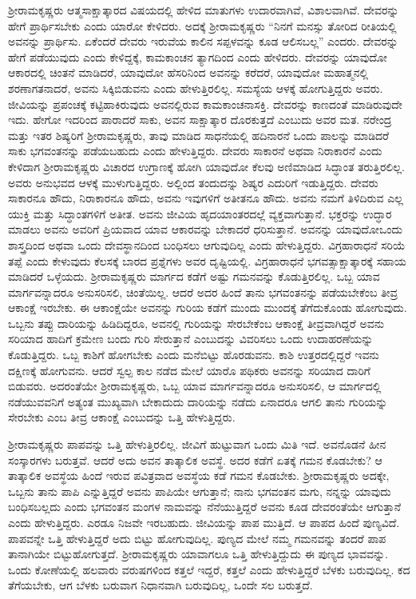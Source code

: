 \vskip 2pt

ಶ‍್ರೀರಾಮಕೃಷ್ಣರು ಆತ್ಮಸಾಕ್ಷಾತ್ಕಾರದ ವಿಷಯದಲ್ಲಿ ಹೇಳಿದ ಮಾತುಗಳು ಉದಾರವಾಗಿವೆ, ವಿಶಾಲವಾಗಿವೆ. ದೇವರನ್ನು ಹೇಗೆ ಪ್ರಾರ್ಥಿಸಬೇಕು ಎಂದು ಯಾರೋ ಕೇಳಿದರು. ಅದಕ್ಕೆ ಶ‍್ರೀರಾಮಕೃಷ್ಣರು “ನಿನಗೆ ಮನಸ್ಸು ತೋರಿದ ರೀತಿಯಲ್ಲಿ ಅವನನ್ನು ಪ್ರಾರ್ಥಿಸು. ಏಕೆಂದರೆ ದೇವರು ಇರುವೆಯ ಕಾಲಿನ ಸಪ್ಪಳವನ್ನು ಕೂಡ ಆಲಿಸಬಲ್ಲ” ಎಂದರು. ದೇವರನ್ನು ಹೇಗೆ ಪಡೆಯುವುದು ಎಂದು ಕೇಳಿದ್ದಕ್ಕೆ, ಕಾಮಕಾಂಚನ ತ್ಯಾಗದಿಂದ ಎಂದು ಹೇಳಿದರು. ದೇವರನ್ನು ಯಾವುದೋ ಆಕಾರದಲ್ಲಿ ಚಿಂತನೆ ಮಾಡಿದರೆ, ಯಾವುದೋ ಹೆಸರಿನಿಂದ ಅವನನ್ನು ಕರೆದರೆ, ಯಾವುದೋ ಮಹಾತ್ಮನಲ್ಲಿ ಶರಣಾಗತನಾದರೆ, ಅವನು ಸಿಕ್ಕಿಬಿಡುವನು ಎಂದು ಹೇಳುತ್ತಿರಲಿಲ್ಲ. ಸಮಸ್ಯೆಯ ಆಳಕ್ಕೆ ಹೋಗುತ್ತಿದ್ದರು ಅವರು. ಜೀವಿಯನ್ನು ಪ್ರಪಂಚಕ್ಕೆ ಕಟ್ಟಿಹಾಕಿರುವುದು ಅವನಲ್ಲಿರುವ ಕಾಮಕಾಂಚನಾಸಕ್ತಿ. ದೇವರನ್ನು ಕಾಣದಂತೆ ಮಾಡಿರುವುದೇ ಇದು. ಹೇಗೋ ಇದರಿಂದ ಪಾರಾದರೆ ಸಾಕು, ಅವನ ಸಾಕ್ಷಾತ್ಕಾರ ದೊರಕುತ್ತದೆ ಎಂಬುದು ಅವರ ಮತ. ನರೇಂದ್ರ ಮತ್ತು ಇತರ ಶಿಷ್ಯರಿಗೆ ಶ‍್ರೀರಾಮಕೃಷ್ಣರು, ತಾವು ಮಾಡಿದ ಸಾಧನೆಯಲ್ಲಿ ಹದಿನಾರನೆ ಒಂದು ಪಾಲನ್ನು ಮಾಡಿದರೆ ಸಾಕು ಭಗವಂತನನ್ನು ಪಡೆಯಬಹುದು ಎಂದು ಹೇಳುತ್ತಿದ್ದರು. ದೇವರು ಸಾಕಾರನೆ ಅಥವಾ ನಿರಾಕಾರನೆ ಎಂದು ಕೇಳಿದಾಗ ಶ‍್ರೀರಾಮಕೃಷ್ಣರು ವಿಚಾರದ ಉಗ್ರಾಣಕ್ಕೆ ಹೋಗಿ ಯಾವುದೋ ಕೆಲವು ಅಣಿಮಾಡಿದ ಸಿದ್ಧಾಂತ ತರುತ್ತಿರಲಿಲ್ಲ. ಅವರು ಅನುಭವದ ಆಳಕ್ಕೆ ಮುಳುಗುತ್ತಿದ್ದರು. ಅಲ್ಲಿಂದ ತಂದುದನ್ನು ಶಿಷ್ಯರ ಎದುರಿಗೆ ಇಡುತ್ತಿದ್ದರು. ದೇವರು ಸಾಕಾರನೂ ಹೌದು, ನಿರಾಕಾರನೂ ಹೌದು, ಅವನು ಇವುಗಳಿಗೆ ಅತೀತನೂ ಹೌದು. ಅವನು ನಮಗೆ ತಿಳಿದಿರುವ ಎಲ್ಲ ಯುಕ್ತಿ ಮತ್ತು ಸಿದ್ಧಾಂತಗಳಿಗೆ ಅತೀತ. ಅವನು ಜೀವಿಯ ಹೃದಯಾಂತರದಲ್ಲೆ ವ್ಯಕ್ತವಾಗುತ್ತಾನೆ. ಭಕ್ತರನ್ನು ಉದ್ಧಾರ ಮಾಡಲು ಅವನು ಅವರಿಗೆ ಪ್ರಿಯವಾದ ಯಾವ ಆಕಾರವನ್ನು ಬೇಕಾದರೆ ಧರಿಸುತ್ತಾನೆ. ಅವನನ್ನು ಯಾವುದೋ\break ಒಂದು ಶಾಸ್ತ್ರದಿಂದ ಅಥವಾ ಒಂದು ದೇವಸ್ಥಾನದಿಂದ ಬಂಧಿಸಲು ಆಗುವುದಿಲ್ಲ ಎಂದು ಹೇಳುತ್ತಿದ್ದರು. ವಿಗ್ರಹಾರಾಧನೆ ಸರಿಯೆ ತಪ್ಪೆ ಎಂದು ಕೇಳುವುದು ಕೆಲಸಕ್ಕೆ ಬಾರದ ಪ್ರಶ್ನೆಗಳು ಅವರ ದೃಷ್ಟಿಯಲ್ಲಿ. ವಿಗ್ರಹಾರಾಧನೆ ಭಗವತ್ಸಾಕ್ಷಾತ್ಕಾರಕ್ಕೆ ಸಹಾಯ ಮಾಡಿದರೆ ಒಳ್ಳೆಯದು. ಶ‍್ರೀರಾಮಕೃಷ್ಣರು ಮಾರ್ಗದ ಕಡೆಗೆ ಅಷ್ಟು ಗಮನವನ್ನು ಕೊಡುತ್ತಿರಲಿಲ್ಲ. ಒಬ್ಬ ಯಾವ ಮಾರ್ಗವನ್ನಾದರೂ ಅನುಸರಿಸಲಿ, ಚಿಂತೆಯಿಲ್ಲ. ಆದರೆ ಅದರ ಹಿಂದೆ ತಾನು ಭಗವಂತನನ್ನು ಪಡೆಯಬೇಕೆಂಬ ತೀವ್ರ ಆಕಾಂಕ್ಷೆ ಇರಬೇಕು. ಈ ಆಕಾಂಕ್ಷೆಯೇ ಅವನನ್ನು ಗುರಿಯ ಕಡೆಗೆ ಮುಂದು ಮುಂದಕ್ಕೆ ತೆಗೆದುಕೊಂಡು ಹೋಗುವುದು. ಒಬ್ಬನು ತಪ್ಪು ದಾರಿಯನ್ನು ಹಿಡಿದಿದ್ದರೂ, ಅವನಲ್ಲಿ ಗುರಿಯನ್ನು ಸೇರಬೇಕೆಂಬ ಆಕಾಂಕ್ಷೆ ತೀವ್ರವಾಗಿದ್ದರೆ ಅವನು ಸರಿಯಾದ ಹಾದಿಗೆ ಕ್ರಮೇಣ ಬಂದು ಗುರಿ ಸೇರುತ್ತಾನೆ ಎಂಬುದನ್ನು ವಿವರಿಸಲು ಒಂದು ಉದಾಹರಣೆಯನ್ನು ಕೊಡುತ್ತಿದ್ದರು. ಒಬ್ಬ ಕಾಶಿಗೆ ಹೋಗಬೇಕು ಎಂದು ಮನೆಬಿಟ್ಟು ಹೊರಡುವನು. ಕಾಶಿ ಉತ್ತರದಲ್ಲಿದ್ದರೆ ಇವನು ದಕ್ಷಿಣಕ್ಕೆ ಹೋಗುವನು. ಆದರೆ ಸ್ವಲ್ಪ ಕಾಲ ನಡೆದ ಮೇಲೆ ಯಾರೊ ಪಥಿಕರು ಅವನನ್ನು ಸರಿಯಾದ ದಾರಿಗೆ ಬಿಡುವರು. ಅದರಂತೆಯೇ ಶ‍್ರೀರಾಮಕೃಷ್ಣರು, ಒಬ್ಬ ಯಾವ ಮಾರ್ಗವನ್ನಾದರೂ ಅನುಸರಿಸಲಿ, ಆ ಮಾರ್ಗದಲ್ಲಿ ನಡೆಯುವವನಿಗೆ ಅತ್ಯಂತ ಮುಖ್ಯವಾಗಿ ಬೇಕಾದುದು ದಾರಿಯನ್ನು ನಡೆದು ಏನಾದರೂ ಆಗಲಿ ತಾನು ಗುರಿಯನ್ನು ಸೇರಬೇಕು ಎಂಬ ತೀವ್ರ ಆಕಾಂಕ್ಷೆ ಎಂಬುದನ್ನು ಒತ್ತಿ ಹೇಳುತ್ತಿದ್ದರು.

ಶ‍್ರೀರಾಮಕೃಷ್ಣರು ಪಾಪವನ್ನು ಒತ್ತಿ ಹೇಳುತ್ತಿರಲಿಲ್ಲ. ಜೀವಿಗೆ ಹುಟ್ಟುವಾಗ ಒಂದು ಮಿತಿ ಇದೆ. ಅವನೊಡನೆ ಹೀನ ಸಂಸ್ಕಾರಗಳು ಬರುತ್ತವೆ. ಆದರೆ ಅದು ಅವನ ತಾತ್ಕಾಲಿಕ ಅವಸ್ಥೆ. ಅದರ ಕಡೆಗೆ ಏತಕ್ಕೆ ಗಮನ ಕೊಡಬೇಕು? ಆ ತಾತ್ಕಾಲಿಕ ಅವಸ್ಥೆಯ ಹಿಂದೆ ಇರುವ ಪವಿತ್ರವಾದ ಅವಸ್ಥೆಯ ಕಡೆ ಗಮನ ಕೊಡಬೇಕು. ಶ‍್ರೀರಾಮಕೃಷ್ಣರು ಅದಕ್ಕೇ, ಒಬ್ಬನು ತಾನು ಪಾಪಿ ಎನ್ನುತ್ತಿದ್ದರೆ ಅವನು ಪಾಪಿಯೇ ಆಗುತ್ತಾನೆ; ನಾನು ಭಗವಂತನ ಮಗು, ನನ್ನನ್ನು ಯಾವುದು ಬಂಧಿಸಬಲ್ಲದು ಎಂದು ಭಗವಂತನ ಮಂಗಳ ನಾಮವನ್ನು ನೆನೆಯುತ್ತಿದ್ದರೆ ಅವನು ಕೂಡ ದೇವರಂತೆಯೇ ಆಗುತ್ತಾನೆ ಎಂದು ಹೇಳುತ್ತಿದ್ದರು. ಎರಡೂ ನಿಜವೇ ಇರಬಹುದು. ಜೀವಿಯನ್ನು ಪಾಪ ಮುತ್ತಿದೆ. ಆ ಪಾಪದ ಹಿಂದೆ ಪುಣ್ಯವಿದೆ. ಪಾಪವನ್ನೇ ಒತ್ತಿ ಹೇಳುತ್ತಿದ್ದರೆ ಅದು ಬಿಟ್ಟು ಹೋಗುವುದಿಲ್ಲ. ಪುಣ್ಯದ ಮೇಲೆ ನಮ್ಮ ಗಮನವನ್ನು ತಂದರೆ ಪಾಪ ತಾನಾಗಿಯೇ ಬಿಟ್ಟುಹೋಗುತ್ತದೆ. ಶ‍್ರೀರಾಮಕೃಷ್ಣರು ಯಾವಾಗಲೂ ಒತ್ತಿ ಹೇಳುತ್ತಿದ್ದುದು ಈ ಪುಣ್ಯದ ಭಾವವನ್ನು. ಒಂದು ಕೋಣೆಯಲ್ಲಿ ಹಲವಾರು ವರುಷಗಳಿಂದ ಕತ್ತಲೆ ಇದ್ದರೆ, ಕತ್ತಲೆ ಎಂದು ಹೇಳುತ್ತಿದ್ದರೆ ಬೆಳಕು ಬರುವುದಿಲ್ಲ. ಕದ ತೆಗೆಯಬೇಕು, ಆಗ ಬೆಳಕು ಬರುವಾಗ ನಿಧಾನವಾಗಿ ಬರುವುದಿಲ್ಲ, ಒಂದೇ ಸಲ ಬರುತ್ತದೆ.

